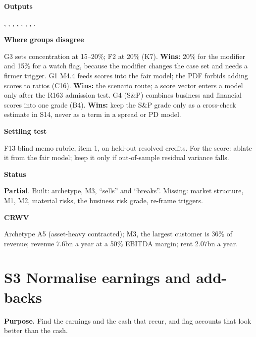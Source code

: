 \documentclass[11pt]{article}
\newcommand{\stpartial}{\textcolor{warn}{\textbf{Partial}}}
\newcommand{\fld}[1]{\par\medskip\noindent\textbf{\textcolor{steel}{#1}}\par\nopagebreak}
\begin{document}
\fld{Outputs} , , , , , , , .

\fld{Where groups disagree} G3 sets concentration at 15--20\%; F2 at 20\% (K7). \textbf{Wins:} 20\% for the modifier and 15\% for a watch flag, because the modifier changes the case set and needs a firmer trigger. G1 M4.4 feeds scores into the fair model; the PDF forbids adding scores to ratios (C16). \textbf{Wins:} the scenario route; a score vector enters a model only after the R163 admission test. G4 (S\&P) combines business and financial scores into one grade (B4). \textbf{Wins:} keep the S\&P grade only as a cross-check estimate in S14, never as a term in a spread or PD model.

\fld{Settling test} F13 blind memo rubric, item 1, on held-out resolved credits. For the score: ablate it from the fair model; keep it only if out-of-sample residual variance falls.

\fld{Status} \stpartial. Built: archetype, M3, ``sells'' and ``breaks''. Missing: market structure, M1, M2, material risks, the business risk grade, re-frame triggers.

\fld{CRWV} Archetype A5 (asset-heavy contracted); M3, the largest customer is 36\% of revenue; revenue 7.6bn a year at a 50\% EBITDA margin; rent 2.07bn a year.
\section{S3 Normalise earnings and add-backs}\label{s3}

\textbf{Purpose.} Find the earnings and the cash that recur, and flag accounts that look better than the cash.
\end{document}
